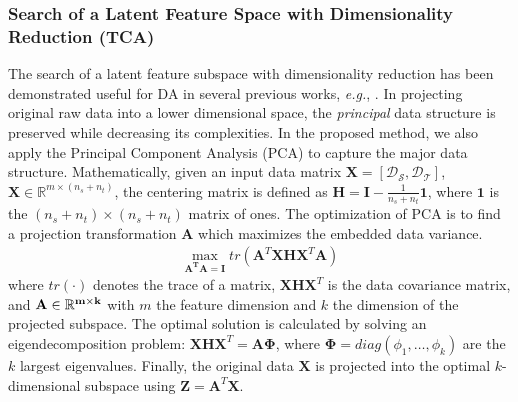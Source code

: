 \documentclass[journal,twocolumn]{IEEEtran}
\begin{document}
\begin{CJK*}{UTF8}{gkai}
\subsubsection{Search of a Latent Feature Space with Dimensionality Reduction (\textbf{TCA})}
\label{subsubsection: TCA}
The search of a latent feature subspace  with dimensionality reduction  has been demonstrated useful for DA in several previous works, \textit{e.g.}, \cite{pan2011domain,long2013transfer,DBLP:journals/corr/LuoWHC17,DBLP:journals/ijcv/ShaoKF14,Zhang_2017_CVPR}.  In projecting  original raw data into a lower dimensional space,  the \emph{principal} data structure is preserved while decreasing its complexities. In the proposed method, we also apply the Principal Component Analysis (PCA) to capture the major data structure.  Mathematically, given  an input data matrix $\boldsymbol{X} = [{\mathcal{D_S}},\mathcal{D_T}]$, $\boldsymbol{X} \in {\mathbb{R}^{m\times({n_s} + {n_t})}}$, the centering matrix is defined as  $\boldsymbol{H} = \boldsymbol{I} - \frac{1}{n_s+n_t}\boldsymbol{1}$, where $\boldsymbol{1}$ is the $(n_s+n_t) \times (n_s+n_t)$ matrix of ones. The optimization of PCA is to find a projection transformation $\boldsymbol{A}$ which  maximizes the embedded data variance.
\begin{equation}\label{eq:pca}
	\begin{array}{c}
		\mathop {\max}\limits_{\boldsymbol{A^TA} = \boldsymbol{I}} tr(\boldsymbol{A}^T\boldsymbol{ XH}\boldsymbol{X}^T \boldsymbol{A})
	\end{array}
\end{equation}
where $tr(\mathord{\cdot})$ denotes the trace of a matrix,   $\boldsymbol{XH}\boldsymbol{X}^T$ is the data covariance matrix, and $\bf A \in \mathbb{R}^{m \times k}$ with $m$ the feature dimension and $k$ the dimension of the projected subspace. The optimal solution  is calculated by solving an eigendecomposition problem: $\boldsymbol{XH}\boldsymbol{X}^T=\boldsymbol{A\Phi}$, where $\boldsymbol{\Phi}=diag(\phi_1,\dots, \phi_k )$ are the $k$ largest eigenvalues. Finally, the original data $\boldsymbol{X}$ is projected into the  optimal $k$-dimensional subspace using $\boldsymbol{Z} = \boldsymbol{A}^T\boldsymbol{X}$. 



\end{CJK*}
\end{document}
